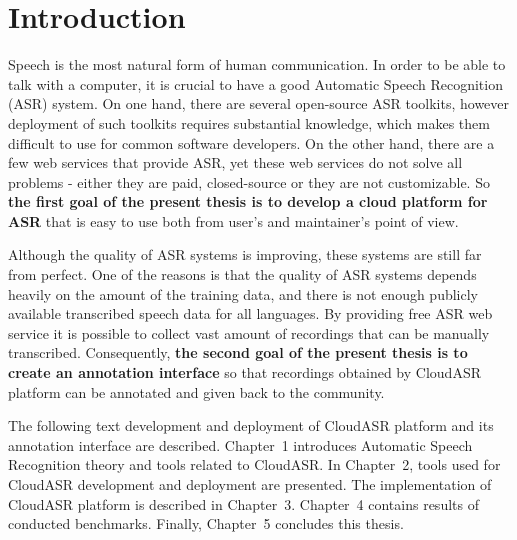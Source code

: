 \chapter*{Introduction}

Speech is the most natural form of human communication.
In order to be able to talk with a computer,
  it is crucial to have a good Automatic Speech Recognition (ASR) system.
On one hand, there are several open-source ASR toolkits,
  however deployment of such toolkits requires substantial knowledge,
  which makes them difficult to use for common software developers.
On the other hand, there are a few web services that provide ASR,
  yet these web services do not solve all problems -
  either they are paid, closed-source or they are not customizable.
So \textbf{the first goal of the present thesis is to develop a cloud platform for ASR}
  that is easy to use both from user's and maintainer's point of view.

Although the quality of ASR systems is improving,
  these systems are still far from perfect.
One of the reasons is that the quality of ASR systems depends heavily on the amount of the training data,
  and there is not enough publicly available transcribed speech data for all languages.
By providing free ASR web service it is possible to collect vast amount of recordings
  that can be manually transcribed.
Consequently, \textbf{the second goal of the present thesis is to create an annotation interface}
  so that recordings obtained by CloudASR platform can be annotated and given back to the community.

The following text development and deployment of CloudASR platform and its annotation interface are described.
Chapter~1 introduces Automatic Speech Recognition theory and tools related to CloudASR.
In Chapter~2, tools used for CloudASR development and deployment are presented.
The implementation of CloudASR platform is described in Chapter~3.
Chapter~4 contains results of conducted benchmarks.
Finally, Chapter~5 concludes this thesis.
